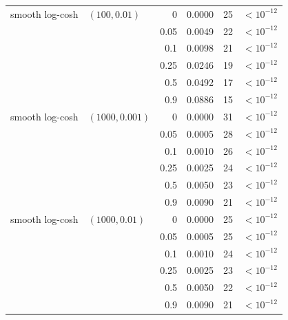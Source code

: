 \begin{tabular}{llrrrr}
\midrule
smooth log-cosh & $(100,0.01)$ & 0 & 0.0000 & 25 & $<\!10^{-12}$ \\
 &  & 0.05 & 0.0049 & 22 & $<\!10^{-12}$ \\
 &  & 0.1 & 0.0098 & 21 & $<\!10^{-12}$ \\
 &  & 0.25 & 0.0246 & 19 & $<\!10^{-12}$ \\
 &  & 0.5 & 0.0492 & 17 & $<\!10^{-12}$ \\
 &  & 0.9 & 0.0886 & 15 & $<\!10^{-12}$ \\
\midrule
smooth log-cosh & $(1000,0.001)$ & 0 & 0.0000 & 31 & $<\!10^{-12}$ \\
 &  & 0.05 & 0.0005 & 28 & $<\!10^{-12}$ \\
 &  & 0.1 & 0.0010 & 26 & $<\!10^{-12}$ \\
 &  & 0.25 & 0.0025 & 24 & $<\!10^{-12}$ \\
 &  & 0.5 & 0.0050 & 23 & $<\!10^{-12}$ \\
 &  & 0.9 & 0.0090 & 21 & $<\!10^{-12}$ \\
\midrule
smooth log-cosh & $(1000,0.01)$ & 0 & 0.0000 & 25 & $<\!10^{-12}$ \\
 &  & 0.05 & 0.0005 & 25 & $<\!10^{-12}$ \\
 &  & 0.1 & 0.0010 & 24 & $<\!10^{-12}$ \\
 &  & 0.25 & 0.0025 & 23 & $<\!10^{-12}$ \\
 &  & 0.5 & 0.0050 & 22 & $<\!10^{-12}$ \\
 &  & 0.9 & 0.0090 & 21 & $<\!10^{-12}$ \\
\bottomrule
\end{tabular}
